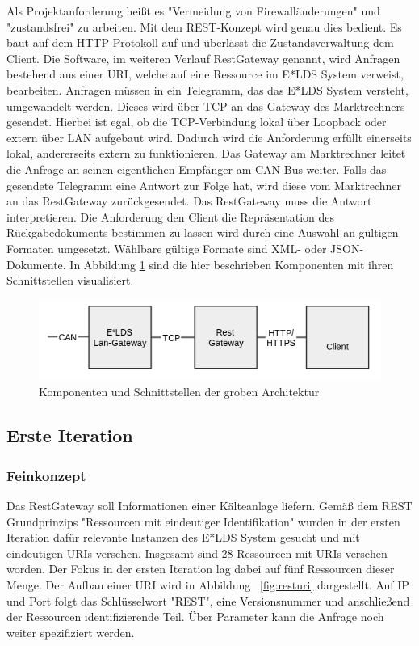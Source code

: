 \documentclass{article}
\begin{document}
Als Projektanforderung heißt es "Vermeidung von Firewalländerungen" und "zustandsfrei" zu arbeiten. Mit dem REST-Konzept wird genau dies bedient. Es baut auf dem HTTP-Protokoll auf und überlässt die Zustandsverwaltung dem Client. Die Software, im weiteren Verlauf RestGateway genannt, wird Anfragen bestehend aus einer URI, welche auf eine Ressource im E*LDS System verweist, bearbeiten. Anfragen müssen in ein Telegramm, das das E*LDS System versteht, umgewandelt werden. Dieses wird über TCP an das Gateway des Marktrechners gesendet. Hierbei ist egal, ob die TCP-Verbindung lokal über Loopback oder extern über LAN aufgebaut wird. Dadurch wird die Anforderung erfüllt einerseits lokal, andererseits extern zu funktionieren. Das Gateway am Marktrechner leitet die Anfrage an seinen eigentlichen Empfänger am CAN-Bus weiter. Falls das gesendete Telegramm eine Antwort zur Folge hat, wird diese vom Marktrechner an das RestGateway zurückgesendet. Das RestGateway muss die Antwort interpretieren. Die Anforderung den Client die Repräsentation des Rückgabedokuments bestimmen zu lassen wird durch eine Auswahl an gültigen Formaten umgesetzt. Wählbare gültige Formate sind XML- oder JSON-Dokumente. In Abbildung \ref{fig:architektur_ueberblick} sind die hier beschrieben Komponenten mit ihren Schnittstellen visualisiert.

\begin{figure}[h]
\centering
\includegraphics[scale=0.5]{Grobkonzept.png}
\caption{Komponenten und Schnittstellen der groben Architektur}
\label{fig:architektur_ueberblick}
\end{figure}

\subsection{Erste Iteration}
\label{sec:it_1}

\subsubsection{Feinkonzept}

Das RestGateway soll Informationen einer Kälteanlage liefern. Gemäß dem REST Grundprinzips "Ressourcen mit eindeutiger Identifikation" wurden in der ersten Iteration dafür relevante Instanzen des E*LDS System gesucht und mit eindeutigen URIs versehen. Insgesamt sind 28 Ressourcen mit URIs versehen worden. Der Fokus in der ersten Iteration lag dabei auf fünf Ressourcen dieser Menge. Der Aufbau einer URI wird in Abbildung ~\ref{fig:resturi} dargestellt. Auf IP und Port folgt das Schlüsselwort "REST", eine Versionsnummer und anschließend der Ressourcen identifizierende Teil. Über Parameter kann die Anfrage noch weiter spezifiziert werden.
\end{document}
